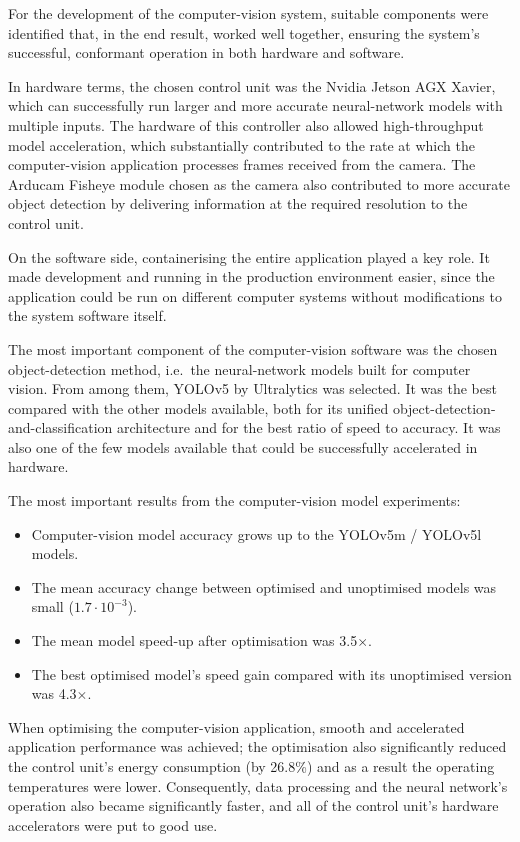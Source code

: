 
For the development of the computer-vision system, suitable components were identified that, in the end result, worked well together, ensuring the system's successful, conformant operation in both hardware and software.

In hardware terms, the chosen control unit was the Nvidia Jetson AGX Xavier, which can successfully run larger and more accurate neural-network models with multiple inputs. The hardware of this controller also allowed high-throughput model acceleration, which substantially contributed to the rate at which the computer-vision application processes frames received from the camera. The Arducam Fisheye module chosen as the camera also contributed to more accurate object detection by delivering information at the required resolution to the control unit.

On the software side, containerising the entire application played a key role. It made development and running in the production environment easier, since the application could be run on different computer systems without modifications to the system software itself.

The most important component of the computer-vision software was the chosen object-detection method, i.e.\ the neural-network models built for computer vision. From among them, YOLOv5 by Ultralytics was selected. It was the best compared with the other models available, both for its unified object-detection-and-classification architecture and for the best ratio of speed to accuracy. It was also one of the few models available that could be successfully accelerated in hardware.

The most important results from the computer-vision model experiments:

\begin{itemize}
\item
  Computer-vision model accuracy grows up to the YOLOv5m / YOLOv5l models.
\item
  The mean accuracy change between optimised and unoptimised models was small ($1.7 \cdot 10^{-3}$).
\item
  The mean model speed-up after optimisation was 3.5$\times$.
\item
  The best optimised model's speed gain compared with its unoptimised version was 4.3$\times$.
\end{itemize}

When optimising the computer-vision application, smooth and accelerated application performance was achieved; the optimisation also significantly reduced the control unit's energy consumption (by 26.8\%) and as a result the operating temperatures were lower. Consequently, data processing and the neural network's operation also became significantly faster, and all of the control unit's hardware accelerators were put to good use.
